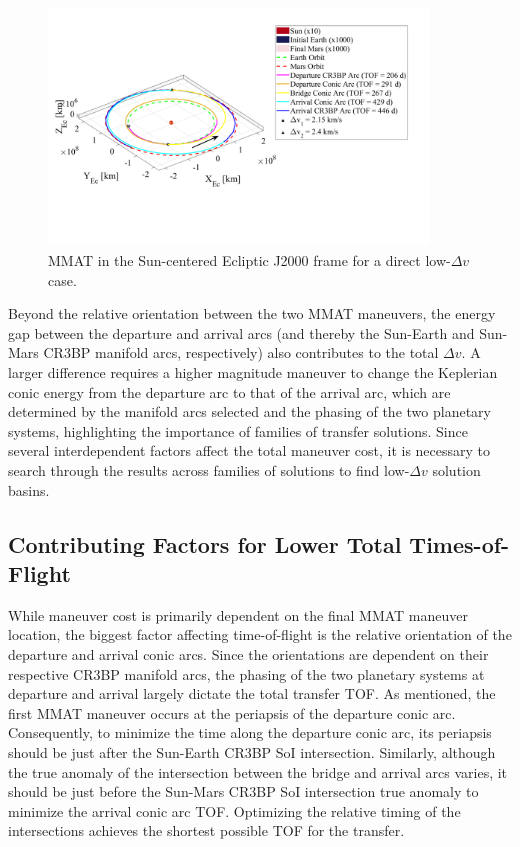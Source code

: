 \begin{figure}[H]
    \centering
    \includegraphics[width=0.9\textwidth]{figures/DirectMinDvMMAT.pdf}
    \caption{MMAT in the Sun-centered Ecliptic J2000 frame for a direct low-$\Delta v$ case.}
    \label{fig:directMinDvMMAT}
\end{figure}

Beyond the relative orientation between the two MMAT maneuvers, the energy gap between the
departure and arrival arcs (and thereby the Sun-Earth and Sun-Mars CR3BP manifold arcs,
respectively) also contributes to the total $\Delta v$. A larger difference requires a higher
magnitude maneuver to change the Keplerian conic energy from the departure arc to that of the
arrival arc, which are determined by the manifold arcs selected and the phasing of the two
planetary systems, highlighting the importance of families of transfer solutions. Since several
interdependent factors affect the total maneuver cost, it is necessary to search through the
results across families of solutions to find low-$\Delta v$ solution basins.

\subsection{Contributing Factors for Lower Total Times-of-Flight}
While maneuver cost is primarily dependent on the final MMAT maneuver location, the biggest factor
affecting time-of-flight is the relative orientation of the departure and arrival conic arcs. Since
the orientations are dependent on their respective CR3BP manifold arcs, the phasing of the two
planetary systems at departure and arrival largely dictate the total transfer TOF. As mentioned,
the first MMAT maneuver occurs at the periapsis of the departure conic arc. Consequently, to
minimize the time along the departure conic arc, its periapsis should be just after the Sun-Earth
CR3BP SoI intersection. Similarly, although the true anomaly of the intersection between the bridge
and arrival arcs varies, it should be just before the Sun-Mars CR3BP SoI intersection true anomaly
to minimize the arrival conic arc TOF. Optimizing the relative timing of the intersections achieves
the shortest possible TOF for the transfer.


